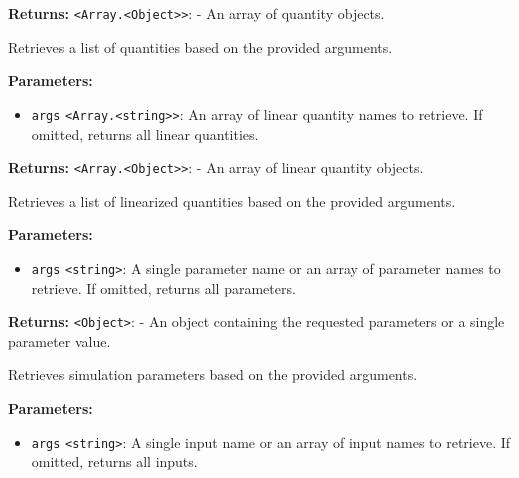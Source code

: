 \documentclass[12pt,a4paper]{article}
\begin{document}
\noindent \textbf{Returns:} \texttt{<Array.<Object>>}: - An array of quantity objects.

\noindent Retrieves a list of quantities based on the provided arguments.

\vspace{5mm}
\noindent {}


\noindent \textbf{Parameters:}
\begin{itemize}
  \item \texttt{args} \texttt{<Array.<string>>}: An array of linear quantity names to retrieve. If omitted, returns all linear quantities.
\end{itemize}

\noindent \textbf{Returns:} \texttt{<Array.<Object>>}: - An array of linear quantity objects.

\noindent Retrieves a list of linearized quantities based on the provided arguments.

\vspace{5mm}
\noindent {}


\noindent \textbf{Parameters:}
\begin{itemize}
  \item \texttt{args} \texttt{<string>}: A single parameter name or an array of parameter names to retrieve. If omitted, returns all parameters.
\end{itemize}

\noindent \textbf{Returns:} \texttt{<Object>}: - An object containing the requested parameters or a single parameter value.

\noindent Retrieves simulation parameters based on the provided arguments.

\vspace{5mm}
\noindent {}


\noindent \textbf{Parameters:}
\begin{itemize}
  \item \texttt{args} \texttt{<string>}: A single input name or an array of input names to retrieve. If omitted, returns all inputs.
\end{itemize}
\end{document}

